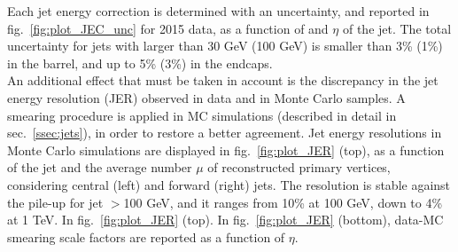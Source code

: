 \noindent Each jet energy correction is determined with an uncertainty, and reported in fig.~\ref{fig:plot_JEC_unc} for 2015 data, as a function of \pt and $\eta$ of the jet. The total uncertainty for jets with \pt larger than 30 GeV (100 GeV) is smaller than 3\% (1\%) in the barrel, and up to 5\% (3\%) in the endcaps.\\
An additional effect that must be taken in account is the discrepancy in the jet energy resolution (JER) observed in data and in Monte Carlo samples. A smearing procedure is applied in MC simulations (described in detail in sec.~\ref{ssec:jets}), in order to restore a better agreement. Jet energy resolutions in Monte Carlo simulations are displayed in fig.~\ref{fig:plot_JER} (top), as a function of the jet \pt and the average number $\mu$ of reconstructed primary vertices, considering central (left) and forward (right) jets. The resolution is stable against the pile-up for jet \pt$>$100 GeV, and it ranges from 10\% at 100 GeV, down to 4\% at 1 TeV. In fig.~\ref{fig:plot_JER} (top). In fig.~\ref{fig:plot_JER} (bottom), data-MC smearing scale factors are reported as a function of $\eta$.

